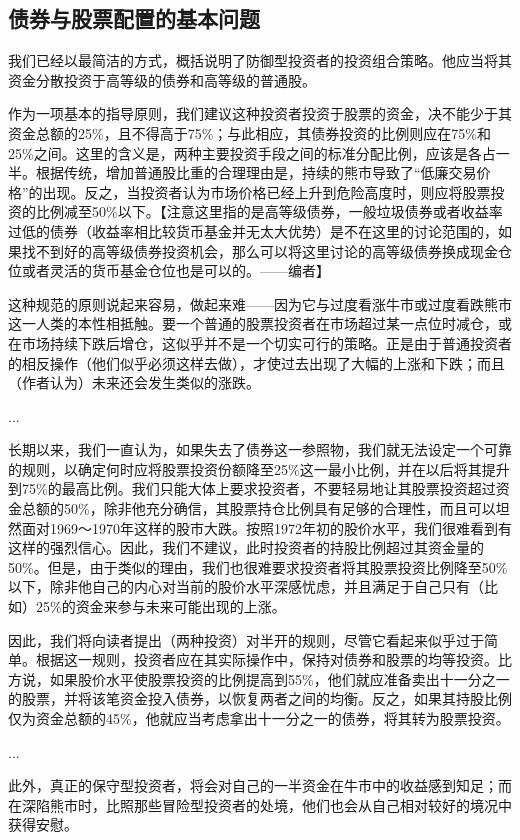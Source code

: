 \documentclass[12pt,oneside]{book}
\begin{document}
\subsection{债券与股票配置的基本问题}
我们已经以最简洁的方式，概括说明了防御型投资者的投资组合策略。他应当将其资金分散投资于高等级的债券和高等级的普通股。

作为一项基本的指导原则，我们建议这种投资者投资于股票的资金，决不能少于其资金总额的25\%，且不得高于75\%；与此相应，其债券投资的比例则应在75\%和25\%之间。这里的含义是，两种主要投资手段之间的标准分配比例，应该是各占一半。根据传统，增加普通股比重的合理理由是，持续的熊市导致了“低廉交易价格”的出现。反之，当投资者认为市场价格已经上升到危险高度时，则应将股票投资的比例减至50\%以下。【注意这里指的是高等级债券，一般垃圾债券或者收益率过低的债券（收益率相比较货币基金并无太大优势）是不在这里的讨论范围的，如果找不到好的高等级债券投资机会，那么可以将这里讨论的高等级债券换成现金仓位或者灵活的货币基金仓位也是可以的。——编者】

这种规范的原则说起来容易，做起来难——因为它与过度看涨牛市或过度看跌熊市这一人类的本性相抵触。要一个普通的股票投资者在市场超过某一点位时减仓，或在市场持续下跌后增仓，这似乎并不是一个切实可行的策略。正是由于普通投资者的相反操作（他们似乎必须这样去做），才使过去出现了大幅的上涨和下跌；而且（作者认为）未来还会发生类似的涨跌。

...

长期以来，我们一直认为，如果失去了债券这一参照物，我们就无法设定一个可靠的规则，以确定何时应将股票投资份额降至25\%这一最小比例，并在以后将其提升到75\%的最高比例。我们只能大体上要求投资者，不要轻易地让其股票投资超过资金总额的50\%，除非他充分确信，其股票持仓比例具有足够的合理性，而且可以坦然面对1969～1970年这样的股市大跌。按照1972年初的股价水平，我们很难看到有这样的强烈信心。因此，我们不建议，此时投资者的持股比例超过其资金量的50\%。但是，由于类似的理由，我们也很难要求投资者将其股票投资比例降至50\%以下，除非他自己的内心对当前的股价水平深感忧虑，并且满足于自己只有（比如）25\%的资金来参与未来可能出现的上涨。

因此，我们将向读者提出（两种投资）对半开的规则，尽管它看起来似乎过于简单。根据这一规则，投资者应在其实际操作中，保持对债券和股票的均等投资。比方说，如果股价水平使股票投资的比例提高到55\%，他们就应准备卖出十一分之一的股票，并将该笔资金投入债券，以恢复两者之间的均衡。反之，如果其持股比例仅为资金总额的45\%，他就应当考虑拿出十一分之一的债券，将其转为股票投资。

...

此外，真正的保守型投资者，将会对自己的一半资金在牛市中的收益感到知足；而在深陷熊市时，比照那些冒险型投资者的处境，他们也会从自己相对较好的境况中获得安慰。
\end{document}
